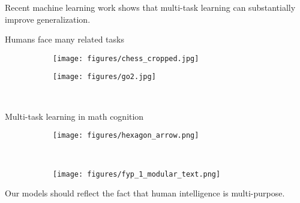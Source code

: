 \documentclass{beamer}
\begin{document}
\begin{frame}[standout]
Recent machine learning work shows that multi-task learning can substantially improve generalization.\par
\end{frame}

\begin{frame}{Humans face many related tasks}
\begin{figure}
\centering
\begin{subfigure}{0.4\textwidth}
\texttt{[image: figures/chess\_cropped.jpg]}
\end{subfigure}%
\begin{subfigure}{0.4\textwidth}
\texttt{[image: figures/go2.jpg]}
\end{subfigure}\\
\end{figure}
\end{frame}

\begin{frame}{Multi-task learning in math cognition}
\begin{figure}
\centering
\begin{subfigure}{0.3\textwidth}
\texttt{[image: figures/hexagon\_arrow.png]}
\end{subfigure}~
\begin{subfigure}{0.6\textwidth}
\texttt{[image: figures/fyp\_1\_modular\_text.png]}
\end{subfigure}
\end{figure}
{
\scriptsize
\citep{Lampinen2017b}
}
\end{frame}

\begin{frame}[standout]
Our models should reflect the fact that human intelligence is multi-purpose.\par
\end{frame}
\end{document}
